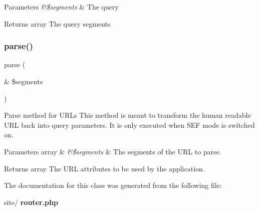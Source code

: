 \begin{DoxyParams}{Parameters}
{\em \&\$segments} & The query\\
\hline
\end{DoxyParams}
\begin{DoxyReturn}{Returns}
array The query segments 
\end{DoxyReturn}
\mbox{\label{classtks__agenda_router_a8ebc2c3e3e69793ecdd51bbcfcd0f3a7}} 
\subsubsection{parse()}
{\footnotesize\ttfamily parse (\begin{DoxyParamCaption}\item[{\&}]{\$segments }\end{DoxyParamCaption})}

Parse method for U\+R\+Ls This method is meant to transform the human readable U\+RL back into query parameters. It is only executed when S\+EF mode is switched on.


\begin{DoxyParams}[1]{Parameters}
array & {\em \&\$segments} & The segments of the U\+RL to parse.\\
\hline
\end{DoxyParams}
\begin{DoxyReturn}{Returns}
array The U\+RL attributes to be used by the application. 
\end{DoxyReturn}


The documentation for this class was generated from the following file\+:\begin{DoxyCompactItemize}
\item 
site/\textbf{ router.\+php}\end{DoxyCompactItemize}
